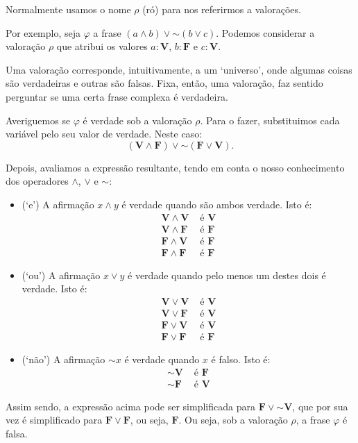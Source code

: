 \documentclass{article}
\theoremstyle{definition}
\theoremstyle{remark}
\newcommand{\V}{\mathbf{V}}
\newcommand{\F}{\mathbf{F}}
\newcommand*{\lneg}{\mathord{\sim}}
\begin{document}
	Normalmente usamos o nome $\rho$ (ró) para nos referirmos a valorações.
	
	Por exemplo, seja $\varphi$ a frase $(a \land b) \lor \lneg (b \lor c)$. Podemos considerar a valoração $\rho$ que atribui os valores $a:\V$, $b:\F$ e $c:\V$.
	
	Uma valoração corresponde, intuitivamente, a um `universo', onde algumas coisas são verdadeiras e outras são falsas. Fixa, então, uma valoração, faz sentido perguntar se uma certa frase complexa é verdadeira.
	
	Averiguemos se $\varphi$ é verdade sob a valoração $\rho$. Para o fazer, substituimos cada variável pelo seu valor de verdade. Neste caso:
	\[(\V \land \F) \lor \lneg (\F \lor \V).\]
	
	Depois, avaliamos a expressão resultante, tendo em conta o nosso conhecimento dos operadores $\land$, $\lor$ e $\lneg$:
	
	\begin{itemize}
	\item (`e') A afirmação $x \land y$ é verdade quando são ambos verdade. Isto é:
	\begin{align*}
	\V \land \V &\text{ é } \V\\
	\V \land \F &\text{ é } \F\\
	\F \land \V &\text{ é } \F\\
	\F \land \F &\text{ é } \F
	\end{align*}
	
	\item (`ou') A afirmação $x \lor y$ é verdade quando pelo menos um destes dois é verdade. Isto é:
	\begin{align*}
	\V \lor \V &\text{ é } \V\\
	\V \lor \F &\text{ é } \V\\
	\F \lor \V &\text{ é } \V\\
	\F \lor \F &\text{ é } \F
	\end{align*}
	
	\item (`não') A afirmação $\lneg x$ é verdade quando $x$ é falso. Isto é:
	\begin{align*}
	\lneg \V &\text{ é } \F\\
	\lneg \F &\text{ é } \V
	\end{align*}
	\end{itemize}
	
	Assim sendo, a expressão acima pode ser simplificada para $\F \lor \lneg \V$, que por sua vez é simplificado para $\F \lor \F$, ou seja, $\F$. Ou seja, sob a valoração $\rho$, a frase $\varphi$ é falsa.
	
\end{document}
